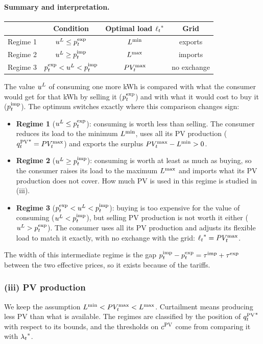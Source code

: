 \paragraph{Summary and interpretation.}
\begin{center}
\begin{tabular}{lccc}
    \toprule
    & Condition & Optimal load ${\ell_{t}}^*$ & Grid \\
    \midrule
    Regime 1 & $u^{L} \leq p^{\mathrm{exp}}_{t}$ & $L^{\min}$ & exports \\
    Regime 2 & $u^{L} \geq p^{\mathrm{imp}}_{t}$ & $L^{\max}$ & imports \\
    Regime 3 & $p^{\mathrm{exp}}_{t} < u^{L} < p^{\mathrm{imp}}_{t}$ & $PV_{t}^{\max}$ & no exchange \\
    \bottomrule
\end{tabular}
\end{center}
The value $u^{L}$ of consuming one more kWh is compared with what the consumer would get for
that kWh by selling it ($p^{\mathrm{exp}}_{t}$) and with what it would cost to buy it ($p^{\mathrm{imp}}_{t}$). The optimum
switches exactly where this comparison changes sign:
\begin{itemize}
    \item \textbf{Regime 1} ($u^{L} \leq p^{\mathrm{exp}}_{t}$): consuming is worth less than selling. The
    consumer reduces its load to the minimum $L^{\min}$, uses all its PV production
    (${q^{\mathrm{PV}}_{t}}^* = PV_{t}^{\max}$) and exports the surplus $PV_{t}^{\max} - L^{\min} > 0$.
    \item \textbf{Regime 2} ($u^{L} \geq p^{\mathrm{imp}}_{t}$): consuming is worth at least as much as buying,
    so the consumer raises its load to the maximum $L^{\max}$ and imports what its PV production
    does not cover. How much PV is used in this regime is studied in (iii).
    \item \textbf{Regime 3} ($p^{\mathrm{exp}}_{t} < u^{L} < p^{\mathrm{imp}}_{t}$): buying is too expensive for the value of
    consuming ($u^{L} < p^{\mathrm{imp}}_{t}$), but selling PV production is not worth it either
    ($u^{L} > p^{\mathrm{exp}}_{t}$). The consumer uses all its PV production and adjusts its flexible load to
    match it exactly, with no exchange with the grid: ${\ell_{t}}^* = PV_{t}^{\max}$.
\end{itemize}
The width of this intermediate regime is the gap $p^{\mathrm{imp}}_{t} - p^{\mathrm{exp}}_{t} = \tau^{\mathrm{imp}} + \tau^{\mathrm{exp}}$ between
the two effective prices, so it exists because of the tariffs.

\subsubsection{(iii) PV production}
We keep the assumption $L^{\min} < PV_{t}^{\max} < L^{\max}$. Curtailment means producing less PV than what
is available. The regimes are classified by the position of ${q^{\mathrm{PV}}_{t}}^*$ with respect to its
bounds, and the thresholds on $c^{\mathrm{PV}}$ come from comparing it with ${\lambda_{t}}^*$.


